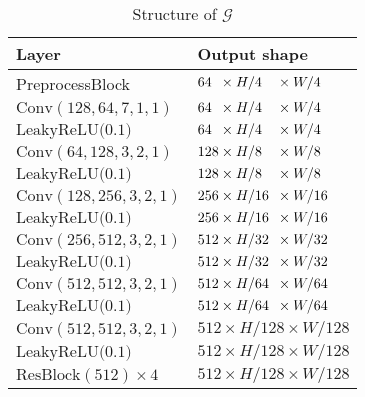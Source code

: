 \documentclass[final]{cvpr}
\begin{document}
\begin{table}[ht]
    \setlength{\tabcolsep}{6pt}
    \centering
    \begin{tabular}{ll}
        \toprule
        Layer                                       &  Output shape\\
        \midrule
        PreprocessBlock & $64\hphantom{0} \times H/4\hphantom{00} \times W/4\hphantom{00}$\\
        $\text{Conv}(128, 64, 7, 1, 1)$              &  $64\hphantom{0} \times H/4\hphantom{00} \times W/4$\\
        $\text{LeakyReLU(0.1)}$                      & $64\hphantom{0} \times H/4\hphantom{00} \times W/4$\\
        
        $\text{Conv}(64, 128, 3, 2, 1)$              & 
        $128 \times H/8\hphantom{00} \times W/8$\\
        $\text{LeakyReLU(0.1)}$                      & 
        $128 \times H/8\hphantom{00} \times W/8$\\
        
        $\text{Conv}(128, 256, 3, 2, 1)$             & 
        $256 \times H/16\hphantom{0} \times W/16$\\
        $\text{LeakyReLU(0.1)}$                      & 
        $256 \times H/16\hphantom{0} \times W/16$\\
        
        $\text{Conv}(256, 512, 3, 2, 1)$             & 
        $512 \times H/32\hphantom{0} \times W/32$\\
        $\text{LeakyReLU(0.1)}$                      & 
        $512 \times H/32\hphantom{0} \times W/32$\\
        
        $\text{Conv}(512, 512, 3, 2, 1)$             & 
        $512 \times H/64\hphantom{0} \times W/64$\\
        $\text{LeakyReLU(0.1)}$                      & 
        $512 \times H/64\hphantom{0} \times W/64$\\
        
        $\text{Conv}(512, 512, 3, 2, 1)$             & 
        $512 \times H/128 \times W/128$\\
        $\text{LeakyReLU(0.1)}$                      & 
        $512 \times H/128 \times W/128$\\
        
        $\text{ResBlock}(512) \times 4$              & 
        $512 \times H/128 \times W/128$\\
        
        \bottomrule
    \end{tabular}
    \caption{Structure of $\mathcal{G}$}
    \label{tab:G_architecture}
\end{table}
\end{document}
